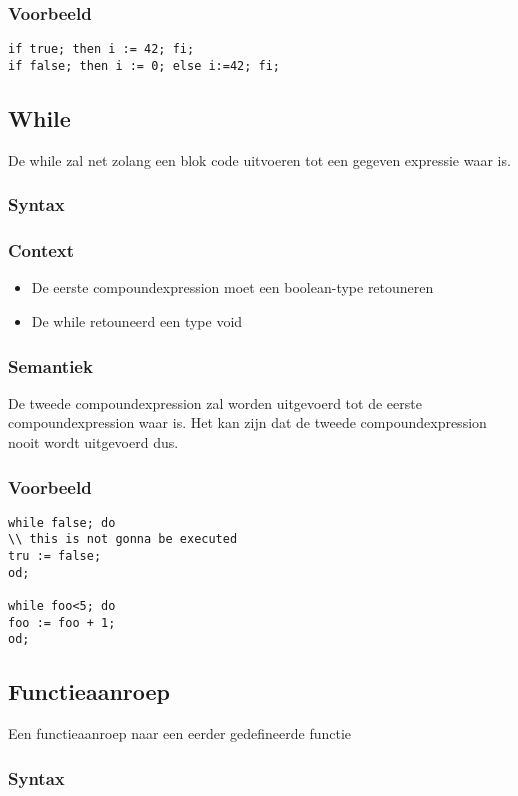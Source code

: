 \documentclass[]{article}
\begin{document}
\subsubsection{Voorbeeld}
\begin{lstlisting}[style=SELMA]
if true; then i := 42; fi;
if false; then i := 0; else i:=42; fi;
\end{lstlisting}

\subsection{While}
De while zal net zolang een blok code uitvoeren tot een gegeven expressie waar is.
\subsubsection{Syntax}

\subsubsection{Context}
\begin{itemize}
\item De eerste compoundexpression moet een boolean-type retouneren
\item De while retouneerd een type void
\end{itemize}
\subsubsection{Semantiek}
De tweede compoundexpression zal worden uitgevoerd tot de eerste compoundexpression waar is. Het kan zijn dat de tweede compoundexpression nooit wordt uitgevoerd dus.
\subsubsection{Voorbeeld}
\begin{lstlisting}[style=SELMA]
while false; do 
\\ this is not gonna be executed
tru := false;
od;

while foo<5; do
foo := foo + 1;
od;
\end{lstlisting}

\subsection{Functieaanroep}
Een functieaanroep naar een eerder gedefineerde functie
\subsubsection{Syntax}

\end{document}
